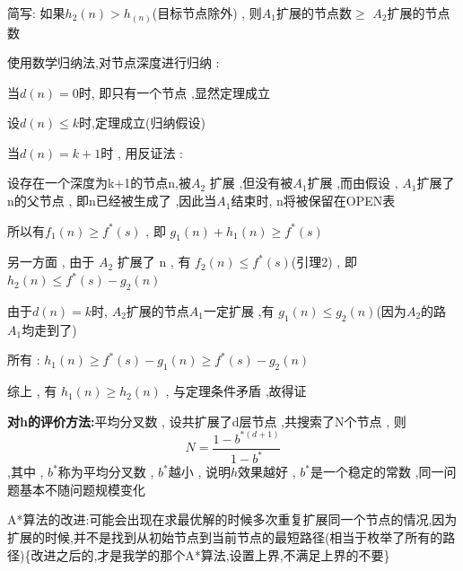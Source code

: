 \documentclass[UTF8,a4paper]{ctexart}
\begin{document}
\begin{itemize}
	      简写: 如果$h_2(n) > h_(n)$(目标节点除外) , 则$A_1$扩展的节点数$\geq$ $A_2$扩展的节点数

	      使用数学归纳法,对节点深度进行归纳 :

	      当$d(n) = 0$时, 即只有一个节点 ,显然定理成立

	      设$d(n) \leq k$时,定理成立(归纳假设)

	      当$d(n) = k + 1$时 , 用反证法 :

	      设存在一个深度为k+1的节点n,被$A_2$ 扩展 ,但没有被$A_1$扩展 ,而由假设 , $A_1$扩展了n的父节点 , 即n已经被生成了 ,因此当$A_1$结束时, n将被保留在OPEN表

	      所以有$f_1(n) \geq f^*(s)$ , 即 $g_1(n) + h_1(n) \geq f^*(s)$

	      另一方面 , 由于 $A_2$ 扩展了 n , 有 $f_2(n) \leq f^*(s)$(引理2) , 即$h_2(n) \leq f^*(s) - g_2(n)$

	      由于$d(n) = k$时, $A_2$扩展的节点$A_1$一定扩展 ,有 $g_1(n) \leq g_2(n)$(因为$A_2$的路$A_1$均走到了)

	      所有 : $h_1(n) \geq f^*(s) - g_1(n) \geq f^*(s) - g_2(n)$

	      综上 , 有 $h_1(n) \geq h_2(n)$  , 与定理条件矛盾 ,故得证
\end{itemize}

\textbf{对h的评价方法:}平均分叉数 , 设共扩展了d层节点 ,共搜索了N个节点 , 则
\[N = \frac{1 - b^{*(d + 1)}}{1 - b^*}\]
,其中 , $b^*$称为平均分叉数 , $b^*$越小 , 说明$h$效果越好 , $b^*$是一个稳定的常数 ,同一问题基本不随问题规模变化

A*算法的改进:可能会出现在求最优解的时候多次重复扩展同一个节点的情况,因为扩展的时候,并不是找到从初始节点到当前节点的最短路径(相当于枚举了所有的路径)\{改进之后的,才是我学的那个A*算法,设置上界,不满足上界的不要\}
\end{document}
